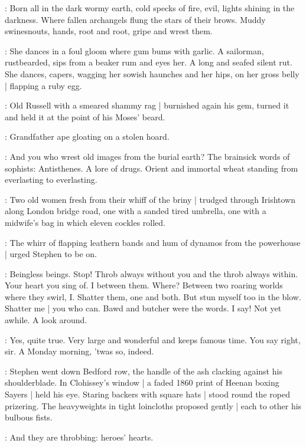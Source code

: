 \StephenInt:
Born all in the dark wormy earth,
cold specks of fire,
evil, lights shining in the darkness.
Where fallen archangels flung the stars of their brows.
Muddy swinesnouts,
hands,
root and root,
gripe and wrest them.

\StephenInt:
She dances in a foul gloom where gum bums with garlic.
A sailorman, rustbearded, sips from a beaker rum and eyes her.
A long and seafed silent rut.%
She dances, capers,
wagging her sowish haunches and her hips,
on her gross belly |
flapping a ruby egg.

:
Old Russell with a smeared shammy rag |
burnished again his gem,
turned it
and held it at the point of his Moses' beard.

\StephenInt:
Grandfather ape gloating on a stolen hoard.

\StephenInt:
And you who wrest old images from the burial earth?
The brainsick words of sophists:
Antisthenes.
A lore of drugs.
Orient and immortal wheat
standing from everlasting to everlasting.

\begin{interject}
    :
    Two old women
    fresh from their whiff of the briny |
    trudged through Irishtown along London bridge road,
    one with a sanded tired umbrella,
    one with a midwife's bag%
    in which eleven cockles rolled.
\end{interject}%

:
The whirr of flapping leathern bands
and hum of dynamos from the powerhouse |
urged Stephen to be on.

\StephenInt:
Beingless beings.
Stop!
Throb always without you
and the throb always within.
Your heart you sing of.
I between them.
Where?
Between two roaring worlds where they swirl, I\@.
Shatter them, one and both.
But stun myself too in the blow.
Shatter me |
you who can.
Bawd and butcher were the words.
I say!
Not yet awhile.
A look around.

\russell:
Yes, quite true.
Very large and wonderful and keeps famous time.
You say right, sir.
A Monday morning, 'twas so, indeed.

:
Stephen went down Bedford row,%
the handle of the ash
clacking against his shoulderblade.
In Clohissey's window |
a faded 1860 print of Heenan boxing Sayers |
held his eye.
Staring backers with square hats |
stood round the roped prizering.
The heavyweights in tight loincloths proposed gently |
each to other his bulbous fists.

\StephenInt:
And they are throbbing:
heroes' hearts.

